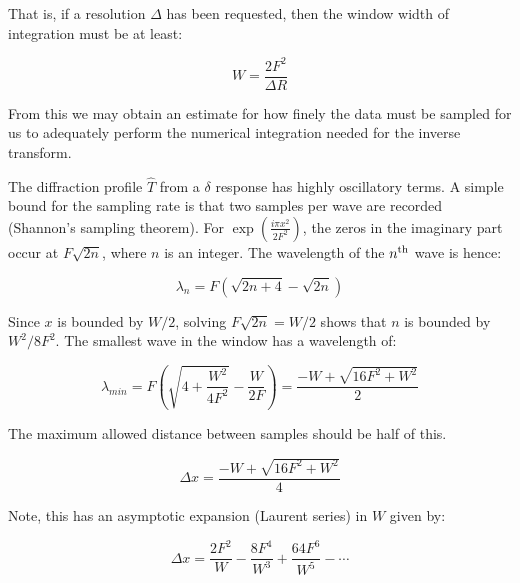 \documentclass{article}
\begin{document}
    That is, if a resolution $\Delta$ has been requested, then the window
    width of integration must be at least:

    \begin{equation}
        W
        =
        \frac{2F^{2}}{\Delta{R}}
    \end{equation}

    From this we may obtain an estimate for how finely the data must be
    sampled for us to adequately perform the numerical integration needed for
    the inverse transform.
    \par\hfill\par
    The diffraction profile $\hat{T}$ from a $\delta$ response has highly
    oscillatory terms. A simple bound for the sampling rate is that
    two samples per wave are recorded (Shannon's sampling theorem).
    For $\exp(\frac{i\pi{x}^{2}}{2F^{2}})$,
    the zeros in the imaginary part occur at $F\sqrt{2n}$, where $n$ is an
    integer. The wavelength of the $n^{\footnotesize\textrm{th}}$ wave is hence:

    \begin{equation}
        \lambda_{n}
        =
        F\left(
            \sqrt{2n+4}-\sqrt{2n}
        \right)
    \end{equation}

    Since $x$ is bounded by $W/2$, solving $F\sqrt{2n}=W/2$ shows that
    $n$ is bounded by $W^{2}/8F^{2}$. The smallest wave in the window has
    a wavelength of:

    \begin{equation}
        \lambda_{min}
        =
        F\left(
            \sqrt{4+\frac{W^{2}}{4F^{2}}}
            -
            \frac{W}{2F}
        \right)
        =
        \frac{-W+\sqrt{16F^{2}+W^{2}}}{2}
    \end{equation}

    The maximum allowed distance between samples should be half of this.

    \begin{equation}
        \Delta{x}
        =
        \frac{-W+\sqrt{16F^{2}+W^{2}}}{4}
    \end{equation}

    Note, this has an asymptotic expansion (Laurent series) in $W$ given by:

    \begin{equation}
        \Delta{x}
        =
        \frac{2F^{2}}{W}
        -
        \frac{8F^{4}}{W^3}
        +
        \frac{64F^{6}}{W^{5}}
        -
        \cdots
    \end{equation}
\end{document}
